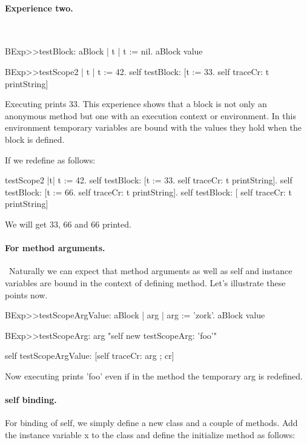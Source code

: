 \documentclass[a4paper,10pt,twoside]{book}
\begin{document}

\paragraph{Experience two.}\ 
\begin{code}{}
BExp>>testBlock: aBlock
	| t | 
	t := nil. 
	aBlock value 
	
BExp>>testScope2 
	| t | 
	t := 42. 
	self testBlock: [t := 33. self traceCr: t printString] 	
\end{code}

Executing  prints 33. This experience shows that a block is not only an anonymous method but one with an execution context or environment. In this environment temporary variables are bound with the values they hold when the block 
is defined. 

If we redefine  as follows: 

\begin{code}{}
testScope2 
	|t|
	t := 42.
	self testBlock: [t := 33. self traceCr: t printString].
	self testBlock: [t := 66. self traceCr: t printString].
	self testBlock: [ self traceCr: t printString]
\end{code}

We will get 33, 66 and 66 printed.




\paragraph{For method arguments.}\
Naturally we can expect that method arguments as well as self and instance variables are bound 
in the context of defining method. Let's illustrate these points now. 

\begin{code}{}
BExp>>testScopeArgValue: aBlock
	| arg | 
	arg := 'zork'.
	aBlock value
	
BExp>>testScopeArg: arg
	"self new testScopeArg: 'foo'"
	
	self testScopeArgValue: [self traceCr: arg ; cr]
\end{code}

Now executing  prints 'foo' even if in the method  the temporary arg is redefined.
 

\paragraph{self binding.}
For binding of self, we simply define a new class and a couple of methods. 
Add the instance variable x to the class  and define the initialize method as follows:
\end{document}
